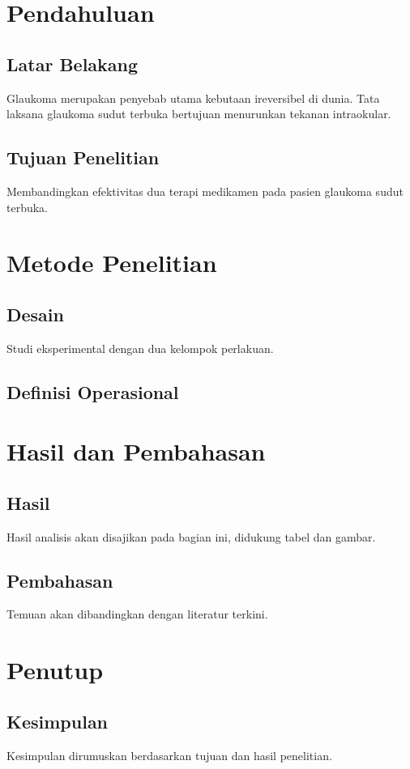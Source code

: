\documentclass[12pt]{report}
\newcommand{\frameworkRoot}{../../}
\begin{document}
\makecover[][Tesis]



\chapter{Pendahuluan}
\section{Latar Belakang}
Glaukoma merupakan penyebab utama kebutaan ireversibel di dunia.\supercite{whoBlindnessVisionImpairment2023} Tata laksana glaukoma sudut terbuka bertujuan menurunkan tekanan intraokular.\supercite{wijayaBukuAjarGlaukoma2018}

\section{Tujuan Penelitian}
Membandingkan efektivitas dua terapi medikamen pada pasien glaukoma sudut terbuka.

\chapter{Metode Penelitian}
\section{Desain}
Studi eksperimental dengan dua kelompok perlakuan.

\section{Definisi Operasional}

\chapter{Hasil dan Pembahasan}
\section{Hasil}
Hasil analisis akan disajikan pada bagian ini, didukung tabel dan gambar.

\section{Pembahasan}
Temuan akan dibandingkan dengan literatur terkini.

\chapter{Penutup}
\section{Kesimpulan}
Kesimpulan dirumuskan berdasarkan tujuan dan hasil penelitian.

\printbibliography[title={Daftar Pustaka}]
\end{document}
